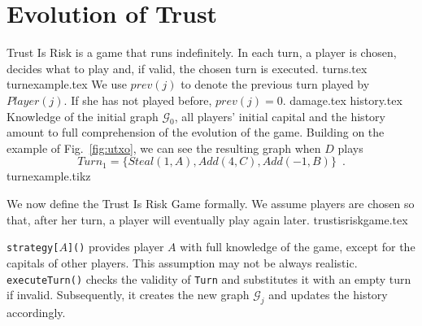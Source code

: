 \section{Evolution of Trust}
  Trust Is Risk is a game that runs indefinitely. In each turn, a player is chosen, decides what to play and, if valid, the
  chosen turn is executed.
  {turns.tex}
  {turnexample.tex}
  We use $prev\left(j\right)$ to denote the previous turn played by $Player(j)$. If she has not played before,
  $prev\left(j\right) = 0$.
  {damage.tex}
  {history.tex}
  \noindent Knowledge of the initial graph $\mathcal{G}_0$, all players' initial capital and the history amount to full
  comprehension of the evolution of the game. Building on the example of Fig.~\ref{fig:utxo}, we can see the resulting graph
  when $D$ plays
  \begin{equation}
  \label{turnexample}
     Turn_1 = \{Steal\left(1, A\right), Add\left(4, C\right), Add\left(-1, B\right)\} \enspace.
  \end{equation}
  {turnexample.tikz}

  \noindent We now define the Trust Is Risk Game formally. We assume players are chosen so that, after her turn, a player will
  eventually play again later.
  {trustisriskgame.tex}

  \noindent \texttt{strategy[}$A$\texttt{]()} provides player $A$ with full knowledge of the game, except for the capitals of
  other players. This assumption may not be always realistic. \texttt{executeTurn()} checks the validity of \texttt{Turn} and
  substitutes it with an empty turn if invalid. Subsequently, it creates the new graph $\mathcal{G}_j$ and updates the
  history accordingly.
